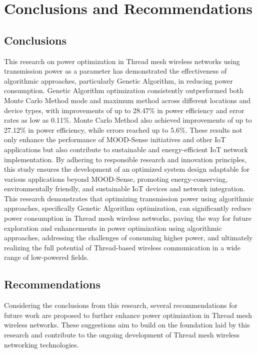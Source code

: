 \chapter{Conclusions and Recommendations}\label{cap:conclusions_recommendations}

\section{Conclusions}\label{sec:conclusions}
This research on power optimization in Thread mesh wireless networks using transmission power as a parameter has demonstrated the effectiveness of algorithmic approaches, particularly Genetic Algorithm, in reducing power consumption. Genetic Algorithm optimization consistently outperformed both Monte Carlo Method mode and maximum method across different locations and device types, with improvements of up to 28.47\% in power efficiency and error rates as low as 0.11\%. Monte Carlo Method also achieved improvements of up to 27.12\% in power efficiency, while errors reached up to 5.6\%. These results not only enhance the performance of MOOD-Sense initiatives and other IoT applications but also contribute to sustainable and energy-efficient IoT network implementation. By adhering to responsible research and innovation principles, this study ensures the development of an optimized system design adaptable for various applications beyond MOOD-Sense, promoting energy-conserving, environmentally friendly, and sustainable IoT devices and network integration. This research demonstrates that optimizing transmission power using algorithmic approaches, specifically Genetic Algorithm optimization, can significantly reduce power consumption in Thread mesh wireless networks, paving the way for future exploration and enhancements in power optimization using algorithmic approaches, addressing the challenges of consuming higher power, and ultimately realizing the full potential of Thread-based wireless communication in a wide range of low-powered fields.


\section{Recommendations}\label{sec:recommendations}
Considering the conclusions from this research, several recommendations for future work are proposed to further enhance power optimization in Thread mesh wireless networks. These suggestions aim to build on the foundation laid by this research and contribute to the ongoing development of Thread mesh wireless networking technologies.

